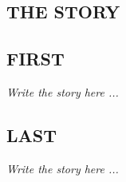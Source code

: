 \begin{multicols*}{2}
\newpage

\begin{center}
    \section*{THE STORY}
\end{center}

\subsection*{\MakeUppercase{First}}

\textit{Write the story here ...}

\subsection*{\MakeUppercase{Last}}

\textit{Write the story here ...}

\end{multicols*}
